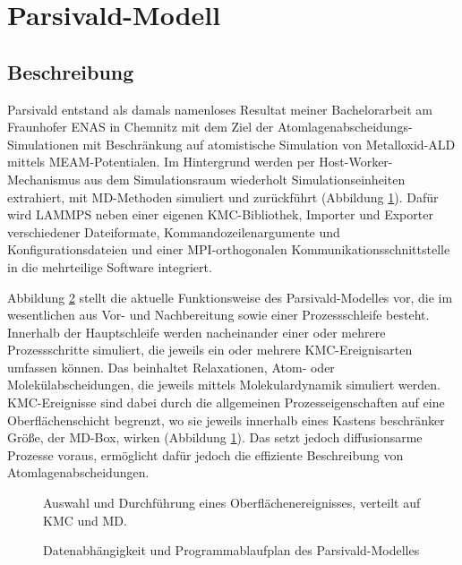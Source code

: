 \section{Parsivald-Modell}
\label{sec:parsivald}

\subsection{Beschreibung}

Parsivald entstand als damals namenloses Resultat meiner Bachelorarbeit\cite{lorenz_entwicklung_2012} am Fraunhofer ENAS in Chemnitz mit dem Ziel der Atom\-lagen\-abscheidungs-Simulationen mit Beschränkung auf atomistische Simulation von Metall\-oxid-ALD mittels MEAM-Potentialen.
Im Hintergrund werden per Host-Worker-Mechanismus aus dem Simulationsraum wiederholt Simulationseinheiten extrahiert, mit MD-Methoden simuliert und zurückführt (Abbildung \ref{fig:parsivald-schema}).
Dafür wird LAMMPS neben einer eigenen KMC-Bibliothek, Importer und Exporter verschiedener Dateiformate, Kommandozeilenargumente und Konfigurationsdateien und einer MPI-orthogonalen Kommunikationsschnittstelle in die mehrteilige Software integriert.

Abbildung \ref{fig:parsivald-stephierarchy} stellt die aktuelle Funktionsweise des Parsivald-Modelles vor, die im wesentlichen aus Vor- und Nachbereitung sowie einer Prozessschleife besteht.
Innerhalb der Hauptschleife werden nacheinander einer oder mehrere Prozessschritte simuliert, die jeweils ein oder mehrere KMC-Ereignisarten umfassen können.
Das beinhaltet Relaxationen, Atom- oder Molekülabscheidungen, die jeweils mittels Molekulardynamik simuliert werden.
KMC-Ereignisse sind dabei durch die allgemeinen Prozesseigenschaften auf eine Oberflächenschicht begrenzt, wo sie jeweils innerhalb eines Kastens beschränker Größe, der MD-Box, wirken (Abbildung \ref{fig:parsivald-schema}).
Das setzt jedoch diffusionsarme Prozesse voraus, ermöglicht dafür jedoch die effiziente Beschreibung von Atomlagenabscheidungen.

\begin{figure}
  \centering
  \def\svgwidth{\textwidth}
  
  \caption[Parsivald-Schema]{
    Auswahl und Durchführung eines Oberflächenereignisses, verteilt auf KMC und MD.
  }
  \label{fig:parsivald-schema}
\end{figure}

\begin{figure}
  \centering
  \def\svgwidth{\textwidth}
  
  \caption[Parsivald-Funktionsweise asd]{
    Datenabhängigkeit und Programmablaufplan des Parsivald-Modelles
  }
  \label{fig:parsivald-stephierarchy}
\end{figure}

